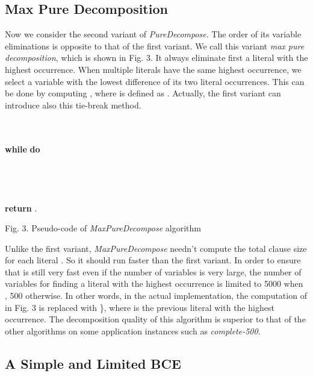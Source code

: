 \documentclass{llncs}
\begin{document}
\subsection{Max Pure Decomposition}

Now we consider the second variant of \emph{PureDecompose}. The
order of its variable eliminations is opposite to that of the first
variant. We call this variant \emph{max pure decomposition}, which
is shown in Fig. 3.  It always eliminate first a literal with the
highest occurrence. When multiple literals  have the same highest
occurrence, we select a variable with the lowest difference of its
two literal occurrences. This can be done by computing
, where  is defined as
. Actually, the first variant can
introduce also this tie-break method.

\begin{flushleft}
\begin{sf}
\begin{footnotesize}
\hskip 12mm \\
\hskip 16mm \\
\hskip 16mm {\bf while }  {\bf do}\\
\hskip 20mm    \\
\hskip 20mm    \\
\hskip 20mm    \\
\hskip 20mm    \\
\hskip 16mm  {\bf return} .

\vspace{1em}
\hskip 8mm \textrm{Fig. 3. Pseudo-code of
\emph{MaxPureDecompose} algorithm}
\end{footnotesize}
\end{sf}
\end{flushleft}

   Unlike the first variant, \emph{MaxPureDecompose} needn't compute
the total clause size  for each literal .
So it should run faster than the first variant.
   In order to ensure that is still very fast even if the number of variables is very large,
the number  of variables for finding a literal with the
highest occurrence is limited to 5000 when , 500
otherwise. In other words, in the actual implementation, the
computation of  in Fig. 3 is replaced with \}, where
 is the previous literal  with the highest occurrence. The
decomposition quality of this algorithm is superior to that of the
other algorithms on some
   application instances such as \emph{complete-500}.


\subsection{A Simple and Limited BCE}
\end{document}
